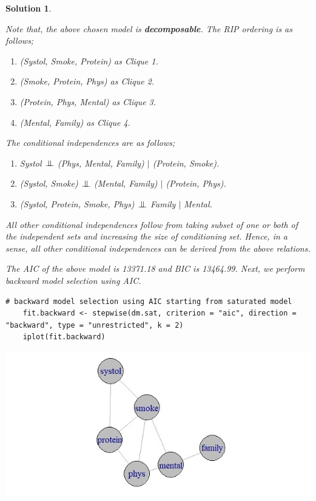 \documentclass[12pt]{article}
\theoremstyle{problemstyle}
\newtheorem*{solution*}{Solution}
\newcommand{\indep}{\mathrel{\text{\scalebox{1.07}{$\perp\mkern-10mu\perp$}}}}
\begin{document}
\begin{solution*}
\begin{enumerate}
	Note that, the above chosen model is \textbf{decomposable}. 
	The RIP ordering is as follows;
	\begin{enumerate}
		\item (Systol, Smoke, Protein) as Clique 1.
		\item (Smoke, Protein, Phys) as Clique 2.
		\item (Protein, Phys, Mental) as Clique 3.
		\item (Mental, Family) as Clique 4.
	\end{enumerate}

	The conditional independences are as follows;
	\begin{enumerate}
		\item Systol $\indep$ (Phys, Mental, Family) $\mid$ (Protein, Smoke).
		\item (Systol, Smoke) $\indep$  (Mental, Family) $\mid$ (Protein, Phys).
		\item (Systol, Protein, Smoke, Phys) $\indep$ Family $\mid$ Mental.
	\end{enumerate}
	All other conditional independences follow from taking subset of one or both of the independent sets and increasing the size of conditioning set. Hence, in a sense, all other conditional independences can be derived from the above relations.
	
	The AIC of the above model is 13371.18 and BIC is 13464.99. Next, we perform backward model selection using AIC.
	
	\begin{lstlisting}[style = R-code]
	# backward model selection using AIC starting from saturated model
	fit.backward <- stepwise(dm.sat, criterion = "aic", direction = "backward", type = "unrestricted", k = 2)
	iplot(fit.backward)
	\end{lstlisting}
	
	\includegraphics[width=\linewidth]{reinis-aic-backward.jpeg}
	

\end{enumerate}
\end{solution*}
\end{document}
